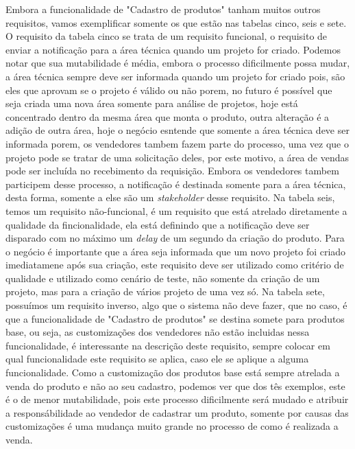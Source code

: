       Embora a funcionalidade de "Cadastro de produtos" tanham muitos outros requisitos,
      vamos exemplificar somente os que estão nas tabelas cinco, seis e sete.
      O requisito da tabela cinco se trata de um requisito funcional, o requisito de
      enviar a notificação para a área técnica quando um projeto for criado. Podemos
      notar que sua mutabilidade é média, embora o processo dificilmente possa mudar,
      a área técnica sempre deve ser informada quando um projeto for criado pois,
      são eles que aprovam se o projeto é válido ou não porem, no futuro é possível
      que seja criada uma nova área somente para análise de projetos, hoje está
      concentrado dentro da mesma área que monta o produto, outra alteração é a
      adição de outra área, hoje o negócio esntende que somente a área técnica deve
      ser informada porem, os vendedores tambem fazem parte do processo, uma vez que
      o projeto pode se tratar de uma solicitação deles, por este motivo, a área de
      vendas pode ser incluída no recebimento da requisição. Embora os vendedores
      tambem participem desse processo, a notificação é destinada somente para a área
      técnica, desta forma, somente a else são um \textit{stakeholder} desse
      requisito. Na tabela seis, temos um requisito não-funcional, é um requisito
      que está atrelado diretamente a qualidade da fincionalidade, ela está definindo
      que a notificação deve ser disparado com no máximo um \textit{delay} de um
      segundo da criação do produto. Para o negócio é importante que a área seja
      informada que um novo projeto foi criado imediatamene após sua criação, este
      requisito deve ser utilizado como critério de qualidade e utilizado como cenário
      de teste, não somente da criação de um projeto, mas para a criação de vários
      projeto de uma vez só. Na tabela sete, possuímos um requisito inverso, algo
      que o sistema não deve fazer, que no caso, é que a funcionalidade de "Cadastro
      de produtos" se destina somete para produtos base, ou seja, as customizações
      dos vendedores não estão incluidas nessa funcionalidade, é interessante na
      descrição deste requisito, sempre colocar em qual funcionalidade este requisito
      se aplica, caso ele se aplique a alguma funcionalidade. Como a customização
      dos produtos base está sempre atrelada a venda do produto e não ao seu
      cadastro, podemos ver que dos tês exemplos, este é o de menor mutabilidade,
      pois este processo dificilmente será mudado e atribuir a responsábilidade ao
      vendedor de cadastrar um produto, somente por causas das customizações é uma
      mudança muito grande no processo de como é realizada a venda.


